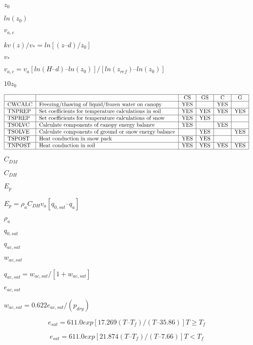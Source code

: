 \documentclass{article}
\begin{document}
$z_0$
\pagebreak

$ln(z_0 )$
\pagebreak

$v_{a,c}$
\pagebreak

$kv(z)/v_* = ln[(z – d)/z_0 ]$
\pagebreak

$v_*$
\pagebreak

$v_{a,c} = v_a [ln(H – d) – ln(z_0 )]/[ln(z_{ref} ) – ln(z_0 )]$
\pagebreak

$10z_0$
\pagebreak

\[ \begin{tabular} { | l | l | c | c | c | c | } \hline & & CS & GS & C & G \\ \hline CWCALC & Freezing/thawing of liquid/frozen water on canopy & YES & & YES & \\ \hline TNPREP & Set coefficients for temperature calculations in soil & YES & YES & YES & YES \\ \hline TSPREP & Set coefficients for temperature calculations of snow & YES & YES & & \\ \hline TSOLVC & Calculate components of canopy energy balance & YES & & YES & \\ \hline TSOLVE & Calculate components of ground or snow energy balance & & YES & & YES \\ \hline TSPOST & Heat conduction in snow pack & YES & YES & & \\ \hline TNPOST & Heat conduction in soil & YES & YES & YES & YES \\ \hline \end{tabular} \]
\pagebreak

$C_{DM}$
\pagebreak

$C_{DH}$
\pagebreak

$E_p$
\pagebreak

$E_p = \rho_a C_{DH} v_a [q_{0,sat} – q_a ]$
\pagebreak

$\rho_a$
\pagebreak

$q_{0,sat}$
\pagebreak

$q_{ac,sat}$
\pagebreak

$w_{ac,sat}$
\pagebreak

$q_{ac,sat} = w_{ac,sat} /[1 + w_{ac,sat} ]$
\pagebreak

$e_{ac,sat}$
\pagebreak

$w_{ac,sat} = 0.622 e_{ac,sat} /(p_{dry} )$
\pagebreak

\[e_{sat} = 611.0 exp[17.269(T – T_f )/(T – 35.86)] T \geq T_f \]
\pagebreak

\[e_{sat} = 611.0 exp[21.874(T – T_f )/(T – 7.66)] T < T_f \]
\pagebreak
\end{document}
